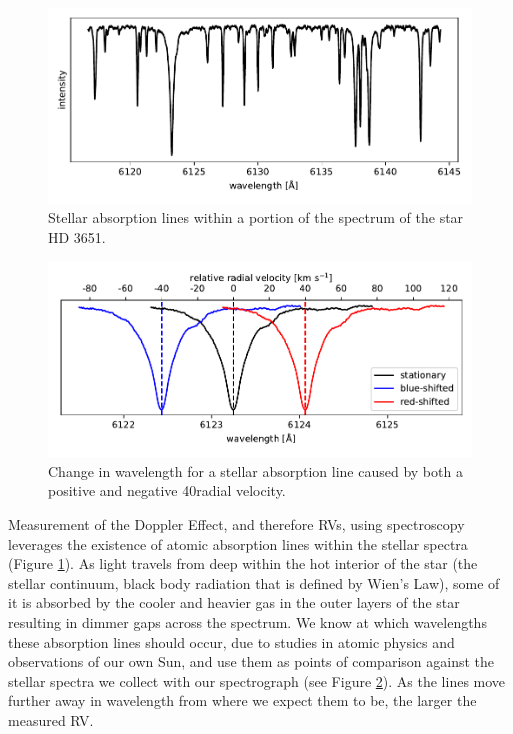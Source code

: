 \begin{figure}
    \centering
    \includegraphics[width=\textwidth]{figures-1/star.pdf}
    \caption{Stellar absorption lines within a portion of the spectrum of the star HD 3651.}
    \label{fig:star}
\end{figure}

\begin{figure}
    \centering
    \includegraphics[width=\textwidth]{figures-1/absorption-lines.pdf}
    \caption{Change in wavelength for a stellar absorption line caused by both a positive and negative 40\kms radial velocity.}
    \label{fig:absorption-lines}
\end{figure}

Measurement of the Doppler Effect, and therefore RVs, using spectroscopy leverages the existence of atomic absorption lines within the stellar spectra (Figure \ref{fig:star}). As light travels from deep within the hot interior of the star (the stellar continuum, black body radiation that is defined by Wien's Law), some of it is absorbed by the cooler and heavier gas in the outer layers of the star resulting in dimmer gaps across the spectrum. We know at which wavelengths these absorption lines should occur, due to studies in atomic physics and observations of our own Sun, and use them as points of comparison against the stellar spectra we collect with our spectrograph (see Figure \ref{fig:absorption-lines}). As the lines move further away in wavelength from where we expect them to be, the larger the measured RV.

